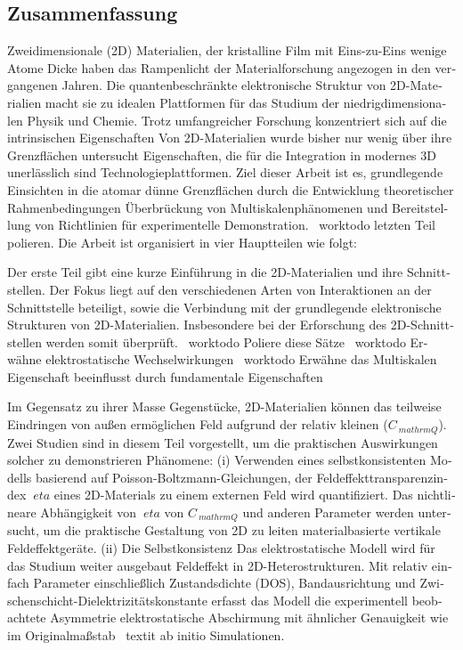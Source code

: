 \endgroup

\cleardoublepage%

\begingroup
\let\clearpage\relax
\let\cleardoublepage\relax
\let\cleardoublepage\relax

\begin{otherlanguage}{ngerman}
\chapter*{Zusammenfassung}

Zweidimensionale (2D) Materialien, der kristalline Film mit Eins-zu-Eins
wenige Atome Dicke haben das Rampenlicht der Materialforschung angezogen
in den vergangenen Jahren.
%
Die quantenbeschränkte elektronische Struktur von 2D-Materialien macht sie zu idealen Plattformen für das Studium der niedrigdimensionalen Physik und Chemie.
%
Trotz umfangreicher Forschung konzentriert sich auf die intrinsischen Eigenschaften
Von 2D-Materialien wurde bisher nur wenig über ihre Grenzflächen untersucht
Eigenschaften, die für die Integration in modernes 3D unerlässlich sind
Technologieplattformen.
%
Ziel dieser Arbeit ist es, grundlegende Einsichten in die
atomar dünne Grenzflächen durch die Entwicklung theoretischer Rahmenbedingungen
Überbrückung von Multiskalenphänomenen und Bereitstellung von Richtlinien für experimentelle
Demonstration. \ worktodo {letzten Teil polieren}. Die Arbeit ist organisiert
in vier Hauptteilen wie folgt:

Der erste Teil gibt eine kurze Einführung in die 2D-Materialien und
ihre Schnittstellen.
%
Der Fokus liegt auf den verschiedenen Arten von Interaktionen
an der Schnittstelle beteiligt, sowie die Verbindung mit der
grundlegende elektronische Strukturen von 2D-Materialien.
%
Insbesondere bei der Erforschung des
2D-Schnittstellen werden somit überprüft. \ worktodo {Poliere diese Sätze} \ worktodo {Erwähne
elektrostatische Wechselwirkungen} \ worktodo {Erwähne das Multiskalen
Eigenschaft beeinflusst durch fundamentale Eigenschaften}


Im Gegensatz zu ihrer Masse
Gegenstücke, 2D-Materialien können das teilweise Eindringen von außen ermöglichen
Feld aufgrund der relativ kleinen ($ C _ {\ mathrm {Q}} $).
%
Zwei Studien sind
in diesem Teil vorgestellt, um die praktischen Auswirkungen solcher zu demonstrieren
Phänomene:
%
(i) Verwenden eines selbstkonsistenten Modells basierend auf
Poisson-Boltzmann-Gleichungen, der Feldeffekttransparenzindex
$ \ eta $ eines 2D-Materials zu einem externen Feld wird quantifiziert. Das
nichtlineare Abhängigkeit von $ \ eta $ von $ C _ {\ mathrm {Q}} $ und anderen
Parameter werden untersucht, um die praktische Gestaltung von 2D zu leiten
materialbasierte vertikale Feldeffektgeräte.
%
(ii) Die Selbstkonsistenz
Das elektrostatische Modell wird für das Studium weiter ausgebaut
Feldeffekt in 2D-Heterostrukturen. Mit relativ einfach
Parameter einschließlich Zustandsdichte (DOS), Bandausrichtung und
Zwischenschicht-Dielektrizitätskonstante erfasst das Modell die experimentell beobachtete Asymmetrie
elektrostatische Abschirmung mit ähnlicher Genauigkeit wie im Originalmaßstab
\ textit {ab initio} Simulationen.



\end{otherlanguage}
